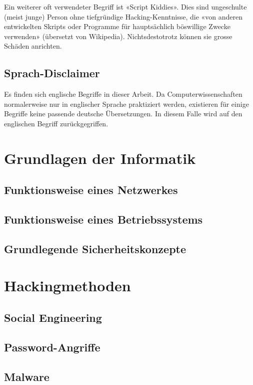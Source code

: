 \documentclass[12pt, a4paper]{article}
\begin{document}
Ein weiterer oft verwendeter Begriff ist «Script Kiddies». Dies sind ungeschulte (meist junge) Person ohne tiefgründige Hacking-Kenntnisse, die «von anderen entwickelten Skripts oder Programme für hauptsächlich böswillige Zwecke verwenden» (übersetzt von Wikipedia). Nichtsdestotrotz können sie grosse Schäden anrichten. \cite{ScriptkiWikipedia:online}

\subsection*{Sprach-Disclaimer}
Es finden sich englische Begriffe in dieser Arbeit. Da Computerwissenschaften normalerweise nur in englischer Sprache praktiziert werden, existieren für einige Begriffe keine passende deutsche Übersetzungen. In diesem Falle wird auf den englischen Begriff zurückgegriffen.


\section{Grundlagen der Informatik}

\subsection{Funktionsweise eines Netzwerkes}

\subsection{Funktionsweise eines Betriebssystems}

\subsection{Grundlegende Sicherheitskonzepte}


\section{Hackingmethoden}

\subsection{Social Engineering}

\subsection{Password-Angriffe}

\subsection{Malware}
\label{chapter_malware}
\end{document}
